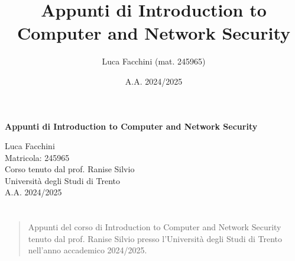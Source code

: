 \documentclass[twoside]{report}
\title{Appunti di Introduction to Computer and Network Security}
\author{Luca Facchini (mat. 245965)}
\date{A.A. 2024/2025}
\makeatletter
\renewenvironment{abstract}{%
    \if@twocolumn
        \section*{\abstractname}%
    \else
        \begin{center}%
            {\bfseries \abstractname\vspace{-.5em}\vspace{\z@}}%
        \end{center}%
        \small
        \begin{quotation}
    \fi}
    {\if@twocolumn\else\end{quotation}\fi}
\makeatother
\begin{document}
    \begin{titlepage}
        \centering  %
        {\Huge\textbf{Appunti di Introduction to Computer and Network Security}} \\[1cm] %
        \vspace{0.5cm}
        
        {\Large Luca Facchini} \\ %
        \vspace{0.3cm}
        {\large Matricola: 245965} \\[2cm] %
        
        {\large Corso tenuto dal prof. Ranise Silvio} \\[0.3cm] %
        {\large Università degli Studi di Trento} \\[1.5cm]
        
        {\large A.A. 2024/2025} \\[3cm] %
        
        \vfill
        \begin{abstract}
            Appunti del corso di Introduction to Computer and Network Security tenuto dal prof. Ranise Silvio presso l'Università degli Studi di Trento nell'anno accademico 2024/2025.
        \end{abstract}
        
        \vfill  %
    \end{titlepage}
    \pagestyle{stdPageS}
    \begingroup
        \setcounter{tocdepth}{2}
        \tableofcontents
    \endgroup
    
    
    
    
    
    
    
    
\end{document}
